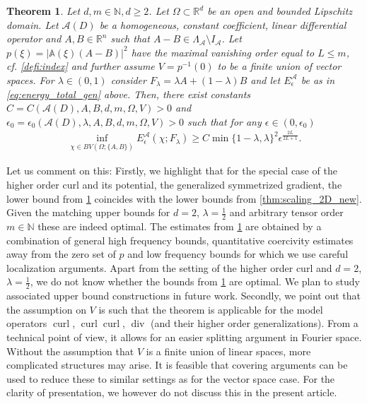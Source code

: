 \documentclass[a4paper, 10pt, twoside, notitlepage]{amsart}
\theoremstyle{plain}
\newtheorem{thm}{Theorem}
\newcommand{\R}{\mathbb{R}}
\newcommand{\N}{\mathbb{N}}
\newcommand{\A}{\mathcal{A}}
\renewcommand{\AA}{\mathbb{A}}
\DeclareMathOperator{\di}{div}
\DeclareMathOperator{\curl}{curl}
\begin{document}
	\begin{thm}\label{thm:lower_bound_p}
		Let $d, m \in \N, d \geq 2$. Let $\Omega \subset \R^d$ be an open and bounded Lipschitz domain.  Let $\A(D)$ be a homogeneous, constant coefficient, linear differential operator and $A,B \in \R^n$ such that
		$A-B \in \Lambda_{\A} \setminus I_{\A}$. Let $p(\xi)=|\AA(\xi)(A-B)|^2$ have the maximal vanishing order equal to $L \leq m$, cf. \cref{defi:index} and further assume $V =  p^{-1}(0)$ to be a finite union of vector spaces. For $\lambda \in (0,1)$ consider $F_\lambda = \lambda A + (1-\lambda)B$ and let $E^{\A}_{\epsilon}$ be as in
		\cref{eq:energy_total_gen} above. Then, there exist constants $C=C(\A(D), A, B, d, m, \Omega, V)>0$ and $\epsilon_0 = \epsilon_0(\A(D),\lambda,A,B,d,m,\Omega,V) > 0$ such that for any $\epsilon \in (0,\epsilon_0)$
		\begin{align*}
			\inf\limits_{\chi \in BV(\Omega;\{A,B\})}  E_{\epsilon}^{\A}(\chi;F_\lambda) \geq C \min\{1-\lambda,\lambda\}^2 \epsilon^{\frac{2L}{2L+1}}.
		\end{align*}
	\end{thm}

	Let us comment on this: Firstly, we highlight that for the special case of the higher order curl and its potential, the generalized symmetrized gradient, the lower bound from \cref{thm:lower_bound_p} coincides with the lower bounds from \cref{thm:scaling_2D_new}. Given the
	matching upper bounds for $d=2$, $\lambda = \frac{1}{2}$ and arbitrary tensor order $m\in \N$ these are indeed optimal. The estimates from \cref{thm:lower_bound_p} are obtained by a combination of general high frequency bounds, quantitative coercivity estimates away from the zero
	set of $p$ and low frequency bounds for which we use careful localization arguments. 
Apart from the setting of the higher order curl and $d=2$, $\lambda = \frac{1}{2}$, we do not know whether
	the bounds from \cref{thm:lower_bound_p} are optimal. We plan to study associated upper bound constructions in future work.
	Secondly, we point out that the assumption on $V$ is such that the theorem is applicable for the model operators $\curl$, $\curl \curl$, $\di$ (and their higher order generalizations). From a technical point of view, it allows for an easier splitting argument in Fourier space. Without the assumption that $V$ is a finite union of linear spaces, more complicated structures may arise. It is feasible that covering arguments can be used to reduce these to similar settings as for the vector space case. For the clarity of presentation, we however do not discuss this in the present article.  
	
\end{document}
